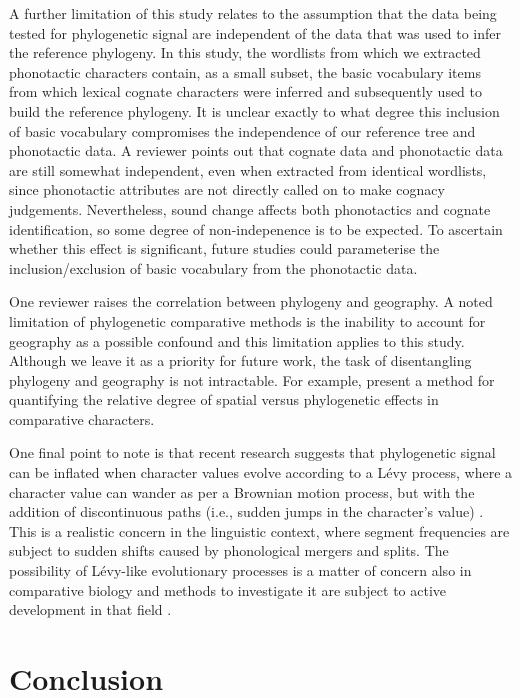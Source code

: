 A further limitation of this study relates to the assumption that the data being tested for phylogenetic signal are independent of the data that was used to infer the reference phylogeny. In this study, the wordlists from which we extracted phonotactic characters contain, as a small subset, the basic vocabulary items from which lexical cognate characters were inferred and subsequently used to build the reference phylogeny. It is unclear exactly to what degree this inclusion of basic vocabulary compromises the independence of our reference tree and phonotactic data. A reviewer points out that cognate data and phonotactic data are still somewhat independent, even when extracted from identical wordlists, since phonotactic attributes are not directly called on to make cognacy judgements. Nevertheless, sound change affects both phonotactics and cognate identification, so some degree of non-indepenence is to be expected. To ascertain whether this effect is significant, future studies could parameterise the inclusion/exclusion of basic vocabulary from the phonotactic data.

One reviewer raises the correlation between phylogeny and geography. A noted limitation of phylogenetic comparative methods is the inability to account for geography as a possible confound \autocite{sookias_deep_2018} and this limitation applies to this study. Although we leave it as a priority for future work, the task of disentangling phylogeny and geography is not intractable. For example, \textcite{freckleton_space_2009} present a method for quantifying the relative degree of spatial versus phylogenetic effects in comparative characters.

One final point to note is that recent research suggests that phylogenetic signal can be inflated when character values evolve according to a Lévy process, where a character value can wander as per a Brownian motion process, but with the addition of discontinuous paths (i.e., sudden jumps in the character's value) \autocite{uyeda_rethinking_2018}. This is a realistic concern in the linguistic context, where segment frequencies are subject to sudden shifts caused by phonological mergers and splits. The possibility of Lévy-like evolutionary processes is a matter of concern also in comparative biology and methods to investigate it are subject to active development in that field \autocite{uyeda_rethinking_2018}.

\hypertarget{conclusion}{%
\section{Conclusion}\label{conclusion}}

